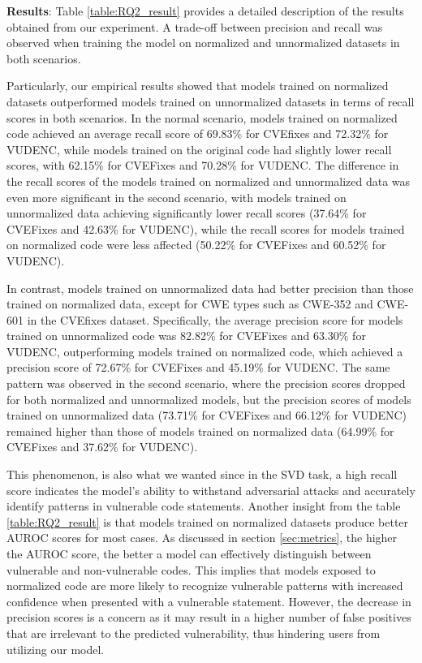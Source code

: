 \documentclass{ieeeaccess}
\begin{document}
\par \textbf{Results}: Table \ref{table:RQ2_result} provides a detailed description of the results obtained from our experiment. A trade-off between precision and recall was observed when training the model on normalized and unnormalized datasets in both scenarios. 
\par Particularly, our empirical results showed that models trained on normalized datasets outperformed models trained on unnormalized datasets in terms of recall  scores in both scenarios. In the normal scenario, models trained on normalized code achieved an average recall score of 69.83\% for CVEfixes and 72.32\% for VUDENC, while models trained on the original code had slightly lower recall scores, with 62.15\% for CVEFixes and 70.28\% for VUDENC. The difference in the recall scores of the models trained on normalized and unnormalized data was even more significant in the second scenario, with models trained on unnormalized data achieving significantly lower recall scores (37.64\% for CVEFixes and 42.63\% for VUDENC), while the recall scores for models trained on normalized code were less affected (50.22\% for CVEFixes and 60.52\% for VUDENC).

\par In contrast, models trained on unnormalized data had better precision than those trained on normalized data, except for CWE types such as CWE-352 and CWE-601 in the CVEfixes dataset. Specifically, the average precision score for models trained on unnormalized code was 82.82\% for CVEFixes and 63.30\% for VUDENC, outperforming models trained on normalized code, which achieved a precision score of 72.67\% for CVEFixes and 45.19\% for VUDENC. The same pattern was observed in the second scenario, where the precision scores dropped for both normalized and unnormalized models, but the precision scores of models trained on unnormalized data (73.71\% for CVEFixes and 66.12\% for VUDENC) remained higher than those of models trained on normalized data (64.99\% for CVEFixes and 37.62\% for VUDENC).

\par This phenomenon, is also what we wanted  since in the SVD task,  a high recall score  indicates the model's ability to withstand adversarial attacks and accurately identify patterns in vulnerable code statements. Another insight from the table \ref{table:RQ2_result} is that models trained on normalized datasets produce better AUROC scores for most cases. As discussed in section \ref{sec:metrics}, the higher the AUROC score, the better  a model can effectively distinguish between vulnerable and non-vulnerable codes. This implies that models exposed to normalized code are more likely to recognize vulnerable patterns with increased confidence when presented with a vulnerable statement. However, the decrease in precision scores is a concern as it may result in a higher number of false positives that are irrelevant to the predicted vulnerability, thus hindering users from utilizing our model.
\end{document}
